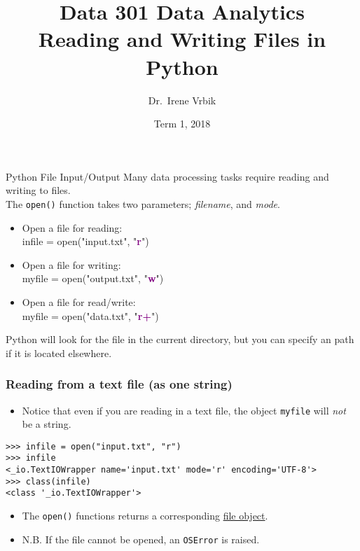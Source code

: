 \documentclass[xcolor=svgnames]{beamer}
\title
  [Data 301 Data Analytics]
  {Data 301 Data Analytics\\
Reading and Writing Files in Python}
\author
  [Dr.\ Irene Vrbik]
  {Dr.\ Irene Vrbik}
\date
  {Term 1, 2018}
\institute
  {University of British Columbia Okanagan \newline irene.vrbik@ubc.ca}
\newcommand{\purple}[1]{{\textcolor{purple}{#1}}}
\newcommand{\nl}{\\[1em]}
\newcommand{\ft}[1]{\frametitle{#1}}
\newenvironment{allintypewriter}{\ttfamily}{\par}
\begin{document}
\maketitle




\begin{frame}{Python File Input/Output}
Many data processing tasks require reading and writing to files.\nl

The \texttt{open()} function takes two parameters; \textit{filename}, and \textit{mode}.\nl


\begin{itemize}
\item Open a file for reading:\\
\begin{allintypewriter}
infile = open("input.txt", "\purple{\bf r}")
\end{allintypewriter}
\item  Open a file for writing:\\
\begin{allintypewriter}
myfile = open("output.txt", "\purple{\bf w}")
\end{allintypewriter}
\item Open a file for read/write:\\
\begin{allintypewriter}
myfile = open("data.txt", "\purple{\bf r+}")\nl
\end{allintypewriter}
\end{itemize}
Python will look for the file in the current directory, but you can specify an path if it is located elsewhere.\nl
\end{frame}


\begin{frame}[fragile]\ft{Reading from a text file (as one string)}
\begin{itemize}

\item Notice that even if you are reading in a text file, the object {\tt myfile} will \textit{not} be a string.
\end{itemize}
\begin{verbatim}
>>> infile = open("input.txt", "r") 
>>> infile
<_io.TextIOWrapper name='input.txt' mode='r' encoding='UTF-8'>
>>> class(infile)
<class '_io.TextIOWrapper'>
\end{verbatim}
\begin{itemize}
\item The {\tt open()} functions returns a corresponding \href{https://docs.python.org/3/glossary.html#term-file-object}{file object}.\nl
\item N.B. If the file cannot be opened, an {\tt OSError} is raised.\nl

\end{itemize}
\end{frame}
\end{document}

